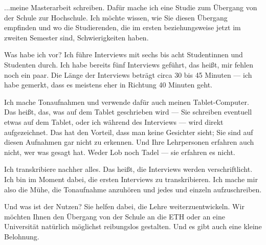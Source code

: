 \begin{spoken-clean}[00:41:28 - 00:45:15]
...meine Masterarbeit schreiben. Dafür mache ich eine Studie zum Übergang von der Schule zur Hochschule. Ich möchte wissen, wie Sie diesen Übergang empfinden und wo die Studierenden, die im ersten beziehungsweise jetzt im zweiten Semester sind, Schwierigkeiten haben.

Was habe ich vor? Ich führe Interviews mit sechs bis acht Studentinnen und Studenten durch. Ich habe bereits fünf Interviews geführt, das heißt, mir fehlen noch ein paar. Die Länge der Interviews beträgt circa 30 bis 45 Minuten --- ich habe gemerkt, dass es meistens eher in Richtung 40 Minuten geht.

Ich mache Tonaufnahmen und verwende dafür auch meinen Tablet-Computer. Das heißt, das, was auf dem Tablet geschrieben wird --- Sie schreiben eventuell etwas auf dem Tablet, oder ich während des Interviews --- wird direkt aufgezeichnet. Das hat den Vorteil, dass man keine Gesichter sieht; Sie sind auf diesen Aufnahmen gar nicht zu erkennen. Und Ihre Lehrpersonen erfahren auch nicht, wer was gesagt hat. Weder Lob noch Tadel --- sie erfahren es nicht.

Ich transkribiere nachher alles. Das heißt, die Interviews werden verschriftlicht. Ich bin im Moment dabei, die ersten Interviews zu transkribieren. Ich mache mir also die Mühe, die Tonaufnahme anzuhören und jedes  und  einzeln aufzuschreiben.

Und was ist der Nutzen? Sie helfen dabei, die Lehre weiterzuentwickeln. Wir möchten Ihnen den Übergang von der Schule an die ETH oder an eine Universität natürlich möglichst reibungslos gestalten. Und es gibt auch eine kleine Belohnung.
\end{spoken-clean}

